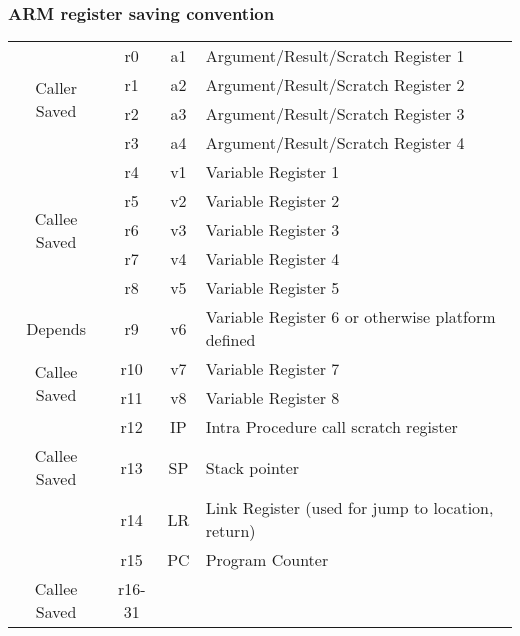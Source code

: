 \documentclass{report}
\begin{document}
            \subsubsection*{ARM register saving convention}
                \begin{center}
                    \begin{tabular}{c c c l}
                        \multirow{4}{*}{Caller Saved} &r0 & a1 & Argument/Result/Scratch Register 1 \\
                        & r1 & a2 & Argument/Result/Scratch Register 2 \\
                        & r2 & a3 & Argument/Result/Scratch Register 3 \\
                        & r3 & a4 & Argument/Result/Scratch Register 4 \\
                        \hline
                        \multirow{5}{*}{Callee Saved}& r4 & v1 & Variable Register 1 \\
                        & r5 & v2 & Variable Register 2 \\
                        & r6 & v3 & Variable Register 3 \\
                        & r7 & v4 & Variable Register 4 \\
                        & r8 & v5 & Variable Register 5 \\
                        \hline
                        Depends& r9 &  v6 & Variable Register 6 or otherwise platform defined \\
                        \hline
                        \multirow{2}{*}{Callee Saved}& r10 & v7 & Variable Register 7 \\
                        & r11 & v8 & Variable Register 8 \\
                        \hline
                        & r12 & IP & Intra Procedure call scratch register \\
                        \hline
                        Callee Saved & r13 & SP & Stack pointer \\
                        \hline
                        & r14 & LR & Link Register (used for jump to location, return) \\
                        & r15 & PC & Program Counter \\
                        \hline
                        Callee Saved & r16-31 \\
                    \end{tabular}
                \end{center}
\end{document}
